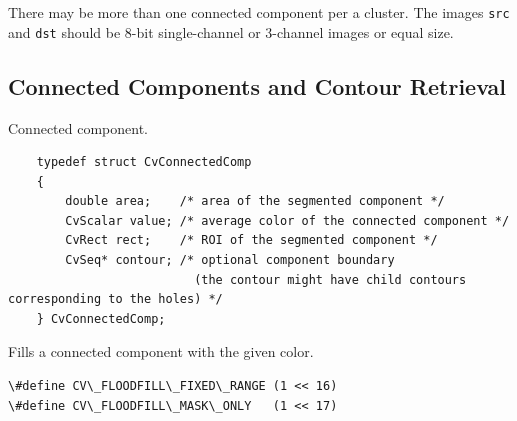 There may be more than one connected component per a cluster. The images \texttt{src} and \texttt{dst} should be 8-bit single-channel or 3-channel images or equal size.

\subsection{Connected Components and Contour Retrieval}

\label{CvConnectedComp}

Connected component.

\begin{lstlisting}
    typedef struct CvConnectedComp
    {
        double area;    /* area of the segmented component */
        CvScalar value; /* average color of the connected component */
        CvRect rect;    /* ROI of the segmented component */
        CvSeq* contour; /* optional component boundary
                          (the contour might have child contours corresponding to the holes) */
    } CvConnectedComp;

\end{lstlisting}

\label{FloodFill}

Fills a connected component with the given color.


\begin{lstlisting}
\#define CV\_FLOODFILL\_FIXED\_RANGE (1 << 16)
\#define CV\_FLOODFILL\_MASK\_ONLY   (1 << 17)
\end{lstlisting}

